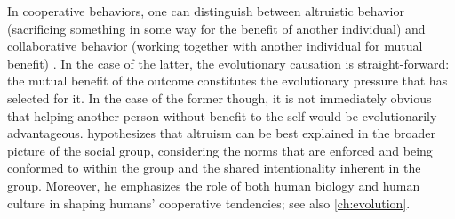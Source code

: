 In cooperative behaviors, one can distinguish between altruistic behavior (sacrificing something in some way for the benefit of another individual) and collaborative behavior (working together with another individual for mutual benefit) \citep{Tomasello09}. In the case of the latter, the evolutionary causation is straight-forward: the mutual benefit of the outcome constitutes the evolutionary pressure that has selected for it. In the case of the former though, it is not immediately obvious that helping another person without benefit to the self would be evolutionarily advantageous. \citep{Tomasello09} hypothesizes that altruism can be best explained in the broader picture of the social group, considering the norms that are enforced and being conformed to within the group and the shared intentionality inherent in the group.
Moreover, he emphasizes the role of both human biology and human culture in shaping humans' cooperative tendencies; see also \cref{ch:evolution}.
